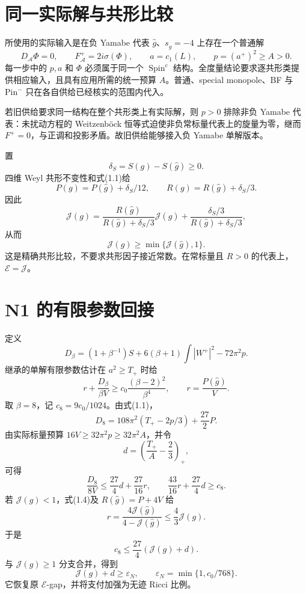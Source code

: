 \documentclass[UTF8,11pt,openany,fontset=none]{ctexbook}
\theoremstyle{definition}
\theoremstyle{remark}
\begin{document}
\section{同一实际解与共形比较}\label{v1-ux540cux4e00ux5b9eux9645ux89e3ux4e0eux5171ux5f62ux6bd4ux8f83}

所使用的实际输入是在负 Yamabe 代表 \(\widehat g\)、\(s_{\widehat g}=-4\) 上存在一个普通解 \[
 D_{\mathcal A}\Phi=0,\qquad F_{\mathcal A}^+=2i\sigma(\Phi),
 \qquad a=c_1(L),\qquad p=(a^+)^2\ge A>0.
\tag{1.3}
\] 每一步中的 \(p,a\) 和 \(\Phi\) 必须属于同一个 \(\operatorname{Spin}^c\) 结构。全度量结论要求逐共形类提供相应输入，且具有应用所需的统一预算 \(A\)。普通、special monopole、BF 与 Pin\({}^{-}\) 只在各自供给已经核实的范围内代入。

若旧供给要求同一结构在整个共形类上有实际解，则 \(p>0\) 排除非负 Yamabe 代表：未扰动方程的 Weitzenböck 恒等式迫使非负常标量代表上的旋量为零，继而 \(F^+=0\)，与正调和投影矛盾。故旧供给能够接入负 Yamabe 单解版本。\cite{I01}

置 \[
 \delta_S=S(g)-S(\widehat g)\ge0.
\] 四维 Weyl 共形不变性和式(1.1)给 \[
 P(g)=P(\widehat g)+\delta_S/12,\qquad
 R(g)=R(\widehat g)+\delta_S/3.
\] 因此 \[
 \mathcal J(g)=
 \frac{R(\widehat g)}{R(\widehat g)+\delta_S/3}\mathcal J(\widehat g)
 +\frac{\delta_S/3}{R(\widehat g)+\delta_S/3},
\] 从而 \[
 \boxed{\mathcal J(g)\ge\min\{\mathcal J(\widehat g),1\}.}
\tag{1.4}
\] 这是精确共形比较，不要求共形因子接近常数。在常标量且 \(R>0\) 的代表上，\(\mathcal E=\mathcal J\)。

\section{N1 的有限参数回接}\label{v1-n1-ux7684ux6709ux9650ux53c2ux6570ux56deux63a5}

定义 \[
 D_\beta=(1+\beta^{-1})S+6(\beta+1)\int|W^+|^2-72\pi^2p.
\tag{1.5}
\] 继承的单解有限参数估计在 \(a^2\ge T_+\) 时给 \[
 r+\frac{D_\beta}{\beta V}\ge
 c_0\frac{(\beta-2)^2}{\beta^4},\qquad r=\frac{P(\widehat g)}V.
\tag{1.6}
\] 取 \(\beta=8\)，记 \(c_8=9c_0/1024\)。由式(1.1)， \[
 D_8=108\pi^2(T_+-2p/3)+\frac{27}{2}P.
\tag{1.7}
\] 由实际标量预算 \(16V\ge32\pi^2p\ge32\pi^2A\)，并令 \[
 d=\left(\frac{T_+}{A}-\frac23\right)_+,
\] 可得 \[
 \frac{D_8}{8V}\le\frac{27}{4}d+\frac{27}{16}r,
 \qquad \frac{43}{16}r+\frac{27}{4}d\ge c_8.
\] 若 \(\mathcal J(g)<1\)，式(1.4)及 \(R(\widehat g)=P+4V\) 给 \[
 r=\frac{4\mathcal J(\widehat g)}{4-\mathcal J(\widehat g)}
 \le\frac43\mathcal J(g).
\] 于是 \[
 c_8\le\frac{27}{4}(\mathcal J(g)+d).
\] 与 \(\mathcal J(g)\ge1\) 分支合并，得到 \[
 \boxed{\mathcal J(g)+d\ge\varepsilon_N,
 \qquad \varepsilon_N=\min\{1,c_0/768\}.}
\tag{1.8}
\] 它恢复原 \(\mathcal E\)-gap，并将支付加强为无迹 Ricci 比例。\cite{I01}
\end{document}
